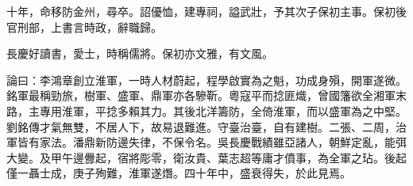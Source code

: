 \begin{pinyinscope}
十年，命移防金州，尋卒。詔優恤，建專祠，謚武壯，予其次子保初主事。保初後官刑部，上書言時政，辭職歸。

長慶好讀書，愛士，時稱儒將。保初亦文雅，有文風。

論曰：李鴻章創立淮軍，一時人材蔚起，程學啟實為之魁，功成身殞，開軍遂微。銘軍最稱勁旅，樹軍、盛軍、鼎軍亦各驂靳。粵寇平而捻匪熾，曾國籓欲全湘軍末路，主專用淮軍，平捻多賴其力。其後北洋籌防，全倚淮軍，而以盛軍為之中堅。劉銘傳才氣無雙，不居人下，故易退難進。守臺治臺，自有建樹。二張、二周，治軍皆有家法。潘鼎新防邊失律，不保令名。吳長慶戰績雖亞諸人，朝鮮定亂，能弭大變。及甲午邊釁起，宿將彫零，衛汝貴、葉志超等庸才僨事，為全軍之玷。後起僅一聶士成，庚子殉難，淮軍遂熸。四十年中，盛衰得失，於此見焉。


\end{pinyinscope}